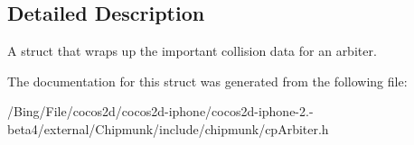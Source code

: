 \subsection{Detailed Description}
A struct that wraps up the important collision data for an arbiter. 

The documentation for this struct was generated from the following file\-:\begin{DoxyCompactItemize}
\item 
/\-Bing/\-File/cocos2d/cocos2d-\/iphone/cocos2d-\/iphone-\/2.-\/beta4/external/\-Chipmunk/include/chipmunk/cp\-Arbiter.\-h\end{DoxyCompactItemize}
